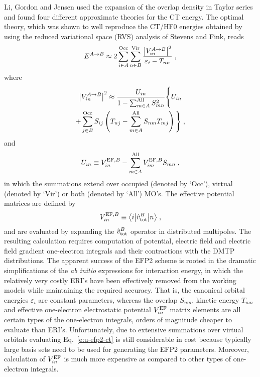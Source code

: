 Li, Gordon and Jensen used the expansion of the overlap density 
in Taylor series and found four different approximate
theories for the CT energy.\cite{Li.Gordon.Jensen.JCP.2006} 
The optimal theory, which was shown
to well reproduce the CT/HF0 energies obtained by using 
the reduced variational space (RVS)
analysis of Stevens and Fink\cite{Stevens.Fink.CPL.1987},
reads
%
\begin{equation} \label{e:u-efp2-ct}
 E^{A\rightarrow B} \approx 
 2\sum_{i\in A}^{\rm Occ}
  \sum_{n\in B}^{\rm Vir}
   \frac{ \left| V_{in}^{A\rightarrow B} \right|^2}{\varepsilon_{i} - T_{nn}} \;,
\end{equation}
%
where
%
\begin{multline} \label{e:u-efp2-ct-v2}
 \left| V_{in}^{A\rightarrow B} \right|^2 \approx
 \frac{U_{in}}{1-\sum_{m\in A}^{\rm All} S_{mn}^2}
 \Bigg\{
   U_{in} \\ + \sum_{j\in B}^{\rm Occ} S_{ij} 
   \left( 
     T_{nj} - \sum_{m\in A}^{\rm All} S_{nm} T_{mj}
   \right)
 \Bigg\} \;,
\end{multline}
%
and 
%
\begin{equation} \label{e:uin-efp2}
 U_{in} \equiv V_{in}^{{\rm EF},B} - \sum_{m\in A}^{\rm All} V_{im}^{{\rm EF},B} S_{mn} \;,
\end{equation}
%
in which the summations extend over occupied (denoted by `Occ'), virtual (denoted by `Vir') 
or both (denoted by `All') MO's. The effective potential 
matrices are defined by
%
\begin{equation} \label{e:v-efp2-eff}
 V_{in}^{{\rm EF},B} \equiv 
 \bigl\langle {i} \bigl\lvert {\hat{v}^B_{\rm tot} } \bigl\lvert {n} \bigr\rangle \;,
\end{equation}
%
and are evaluated by expanding the $\hat{v}^B_{\rm tot}$ operator
in distributed multipoles. The resulting calculation requires computation
of potential, electric field and electric field gradient one\hyp{}electron integrals
and their contractions with the DMTP distributions.
The apparent success of the EFP2 scheme is rooted in the dramatic simplifications of the
\emph{ab initio} expressions for interaction energy, in which
the relatively very costly ERI's
have been effectively removed from the working models while maintaining the required accuracy. 
That is, the canonical orbital energies $\varepsilon_i$ are
constant parameters, whereas the overlap $S_{nm}$, kinetic energy $T_{mn}$ and effective
one\hyp{}electron electrostatic potential $V_{in}^{{\rm EF}}$ matrix elements
are all certain types of the one\hyp{}electron integrals, orders of magnitude cheaper to
evaluate than ERI's. Unfortunately, due to extensive summations over virtual orbitals
evaluating Eq.~\eqref{e:u-efp2-ct} is still considerable in cost because typically large basis sets
need to be used for generating the EFP2 parameters. Moreover, calculation of $V_{in}^{{\rm EF}}$
is much more expensive as compared to other types of one\hyp{}electron integrals.

